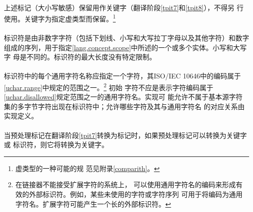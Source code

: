 \paragraph{}
上述标记（大小写敏感）保留用作关键字（翻译阶段\ref{tpit7}和\ref{tpit8}），不得另
行使用。关键字为指定虚类型而保留。\footnote{虚类型的一种可能的规
范见附录\ref{comparith}。}

\syntax
\paragraph{}

\semantic
\paragraph{}
标识符是由非数字字符（包括下划线\tm{\_}、小写和大写拉丁字母以及其他字符）和数字
组成的序列，用于指定\ref{lang.concept.scope}中所述的一个或多个实体。小写和大写字
母是不同的。标识符的最大长度没有特定限制。

\paragraph{}
标识符中的每个通用字符名称应指定一个字符，其ISO/IEC 10646中的编码属于
\ref{uchar.range}中规定的范围之一。\footnote{在链接器不能接受扩展字符的系统上，
可以使用通用字符名的编码来形成有效的外部标识符。例如，某些未使用的字符或字符序列
可用于将编码为通用字符名。扩展字符可能产生一个长的外部标识符。} 初始
字符不应是表示字符编码属于\ref{uchar.disallowed}规定范围之一的通用字符名。实现可
能允许不属于基本源字符集的多字节字符出现在标识符中；允许哪些字符及其与通用字符名
的对应关系由实现定义。

\paragraph{}
当预处理标记在翻译阶段\ref{tpit7}转换为标记时，如果预处理标记可以转换为关键字或
标识符，则它将转换为关键字。

